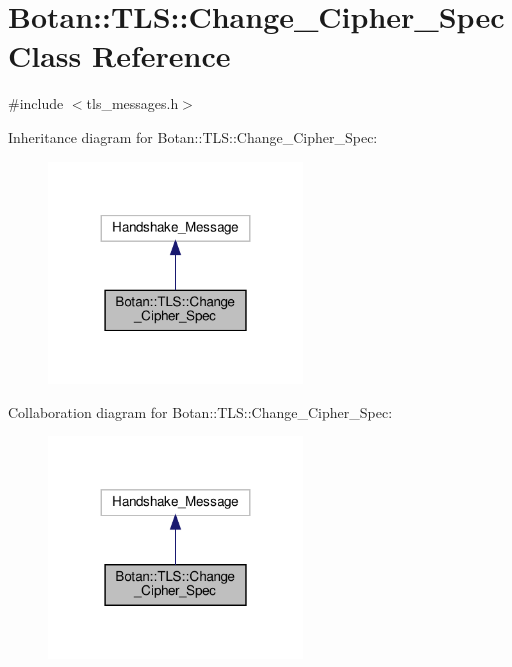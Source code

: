 \hypertarget{class_botan_1_1_t_l_s_1_1_change___cipher___spec}{}\section{Botan\+:\+:T\+LS\+:\+:Change\+\_\+\+Cipher\+\_\+\+Spec Class Reference}
\label{class_botan_1_1_t_l_s_1_1_change___cipher___spec}


{\ttfamily \#include $<$tls\+\_\+messages.\+h$>$}



Inheritance diagram for Botan\+:\+:T\+LS\+:\+:Change\+\_\+\+Cipher\+\_\+\+Spec\+:
\nopagebreak
\begin{figure}[H]
\begin{center}
\leavevmode
\includegraphics[width=191pt]{class_botan_1_1_t_l_s_1_1_change___cipher___spec__inherit__graph}
\end{center}
\end{figure}


Collaboration diagram for Botan\+:\+:T\+LS\+:\+:Change\+\_\+\+Cipher\+\_\+\+Spec\+:
\nopagebreak
\begin{figure}[H]
\begin{center}
\leavevmode
\includegraphics[width=191pt]{class_botan_1_1_t_l_s_1_1_change___cipher___spec__coll__graph}
\end{center}
\end{figure}
